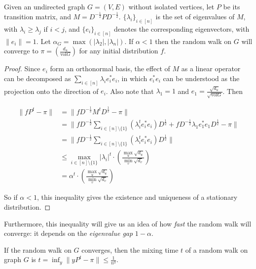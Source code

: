 \begin{lemma}
Given an undirected graph $G=(V, E)$ without isolated vertices, let
$P$ be its transition matrix, and
$M=D^{-\frac{1}{2}}PD^{-\frac{1}{2}}$. $\{\lambda_i\}_{i\in[n]}$ is
the set of eigenvalues of $M$, with $\lambda_i\geq \lambda_j$ if
$i<j$, and $\{e_i\}_{i\in[n]}$ denotes the corresponding
eigenvectors, with $\parallel e_i\parallel =1$. Let
$\alpha_G=\max{(|\lambda_2|, |\lambda_n|)}$. If $\alpha<1$ then the
random walk on $G$ will converge to $\pi=(\frac {d_u}{\text{vol}G})$
for any initial distribution $f$.
\end{lemma}

\begin{proof}
Since $e_i$ form an orthonormal basis, the effect of $M$ as a linear
operator can be decomposed as $\sum_{i\in [n]} \lambda_i e_i^* e_i$,
in which $e_i^* e_i$ can be understood as the projection onto the
direction of $e_i$. Also note that $\lambda_1=1$ and
$e_1=\frac{\sqrt{d_u}}{\sqrt{\text{vol}G}}$. Then

\begin{align}
\parallel fP^t-\pi \parallel &= \parallel
fD^{-\frac{1}{2}}M^tD^{\frac{1}{2}}- \pi \parallel \\
&=\parallel fD^{-\frac{1}{2}}\sum_{i\in[n]\setminus
\{1\}}(\lambda_i^t e_i^*
e_i)D^{\frac{1}{2}}+fD^{-\frac{1}{2}}\lambda_1 e_1^* e_1
D^{\frac{1}{2}}- \pi \parallel \\
&=\parallel fD^{-\frac{1}{2}}\sum_{i\in[n]\setminus
\{1\}}(\lambda_i^t e_i^* e_i)D^{\frac{1}{2}} \parallel \\
&\leq \max_{i\in[n]\setminus \{1\}}|\lambda_i|^t\cdot
(\frac{\max_u\sqrt{d_u}}{\min_v{\sqrt{d_v}}}) \\
&= \alpha^t \cdot(\frac{\max_u\sqrt{d_u}}{\min_v{\sqrt{d_v}}})
\end{align}

So if $\alpha<1$, this inequality gives the existence and uniqueness
of a stationary distribution.
\end{proof}

Furthermore, this inequality will give us an idea of how \emph{fast}
the random walk will converge: it depends on the \emph{eigenvalue
gap} $1-\alpha$.

\begin{definition}
If the random walk on $G$ converges, then the mixing time $t$ of a
random walk on graph $G$ is $t=\inf_y{\parallel yP^t-\pi \parallel
\leq \frac{1}{n^3}}$.
\end{definition}

